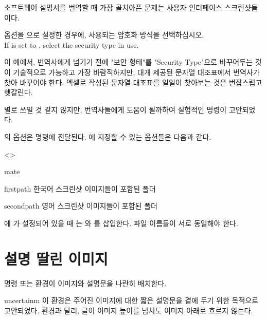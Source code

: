 \documentclass[pairquote, minted]{hzguide}
\begin{document}
소프트웨어 설명서를 번역할 때 가장 골치아픈 문제는 사용자 인터페이스 스크린샷들이다.

\begin{reference}
 옵션을 으로 설정한 경우에, 사용되는 암호화 방식을 선택하십시오. \\
If  is set to , select the security type in use.
\end{reference}

이 예에서, 번역사에게 넘기기 전에 "보안 형태"를 "Security Type"으로 바꾸어두는 것이 기술적으로 가능하고 가장 바람직하지만, 
대개 제공된 문자열 대조표에서 번역사가 찾아 바꾸어야 한다.
엑셀로 작성된 문자열 대조표를 일일이 찾아보는 것은 번잡스럽고 헷갈린다.

별로 쓰일 것 같지 않지만, 번역사들에게 도움이 될까하여 실험적인 \macro{\mateimage} 명령이 고안되었다.

\begin{code}
\end{code}

\macro{\mateimage}의 옵션은 \macro{\image} 명령에 전달된다.
\macro{\MateSetup}에 지정할 수 있는 옵션들은 다음과 같다.

\begin{macros}<\MateSetup>
\item[mate] 
\item[firstpath] 
한국어 스크린샷 이미지들이 포함된 폴더
\item[secondpath] 
영어 스크린샷 이미지들이 포함된 폴더
\end{macros}

에 가 설정되어 있을 때 는 와 를 삽입한다.
파일 이름들이 서로 동일해야 한다.

\section{설명 딸린 이미지}

\macro{\illustimage} 명령 또는  환경이 이미지와 설명문을 나란히 배치한다.

\begin{coderesult}
\begin{IllustImage}{uncertainm}
이 환경은 주어진 이미지에 대한 짧은 설명문을 곁에 두기 위한 목적으로 고안되었다.
 환경과 달리, 글이 이미지 높이를 넘쳐도 이미지 아래로 흐르지 않는다.
\end{IllustImage}
\end{coderesult}
\end{document}
